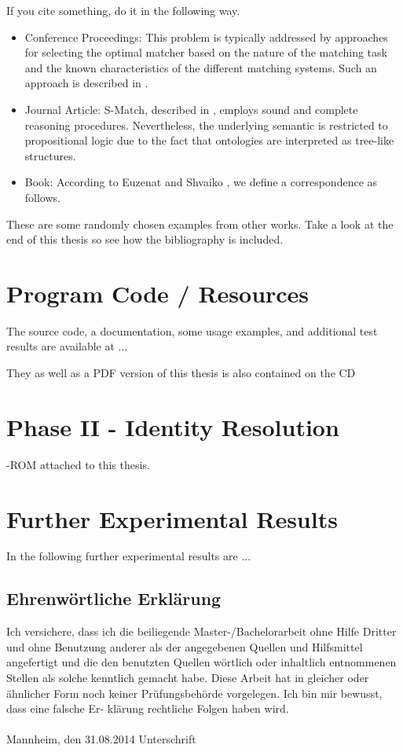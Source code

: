\documentclass[11pt,titlepage,oneside,openany]{book}
\begin{document}
If you cite something, do it in the following way. 
\begin{itemize}
	\item Conference Proceedings: This problem is typically addressed by approaches for selecting the optimal matcher based on the nature of the matching task and the known characteristics of the different matching systems. Such an approach is described in \cite{mochol08matcher}.
	\item Journal Article: S-Match, described in \cite{giunchiglia2008semanticmatching}, employs sound and complete reasoning procedures. Nevertheless, the underlying semantic is restricted to propositional logic due to the fact that ontologies are interpreted as tree-like structures.
	\item Book: According to Euzenat and Shvaiko \cite{euzenat07matcherbook}, we define a correspondence as follows.
\end{itemize}
These are some randomly chosen examples from other works. Take a look at the end of this thesis so see how the bibliography is included.







\appendix

\chapter{Program Code / Resources}
\label{cha:appendix-a}

The source code, a documentation, some usage examples, and additional test results are available at ...

They as well as a PDF version of this thesis is also contained on the CD\chapter{Phase II - Identity Resolution}
\label{cha:intro}-ROM attached to this thesis.

\chapter{Further Experimental Results}
\label{cha:appendix-b}

In the following further experimental results are ...


\newpage


\pagestyle{empty}


\section*{Ehrenw\"ortliche Erkl\"arung}
Ich versichere, dass ich die beiliegende Master-/Bachelorarbeit ohne Hilfe Dritter
und ohne Benutzung anderer als der angegebenen Quellen und Hilfsmittel
angefertigt und die den benutzten Quellen w\"ortlich oder inhaltlich
entnommenen Stellen als solche kenntlich gemacht habe. Diese Arbeit
hat in gleicher oder \"ahnlicher Form noch keiner Pr\"ufungsbeh\"orde
vorgelegen. Ich bin mir bewusst, dass eine falsche Er- kl\"arung rechtliche Folgen haben
wird.
\\
\\

\noindent
Mannheim, den 31.08.2014 \hspace{4cm} Unterschrift
\end{document}
